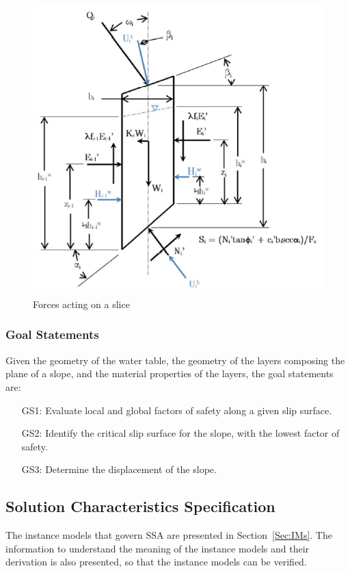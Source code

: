 \documentclass[12pt]{article}
\begin{document}
\begin{figure}
\begin{center}
\includegraphics[width=\textwidth]{ForceDiagram.png}
\caption{Forces acting on a slice}
\label{Figure:ForceDiagram}
\end{center}
\end{figure}
\subsubsection{Goal Statements}
\label{Sec:GoalStmt}
Given the geometry of the water table, the geometry of the layers composing the plane of a slope, and the material properties of the layers, the goal statements are:
\begin{itemize}
\item[GS1:]Evaluate local and global factors of safety along a given slip surface.
\item[GS2:]Identify the critical slip surface for the slope, with the lowest factor of safety.
\item[GS3:]Determine the displacement of the slope.
\end{itemize}
\subsection{Solution Characteristics Specification}
\label{Sec:SolCharSpec}
The instance models that govern SSA are presented in Section~\ref{Sec:IMs}. The information to understand the meaning of the instance models and their derivation is also presented, so that the instance models can be verified.
\end{document}
